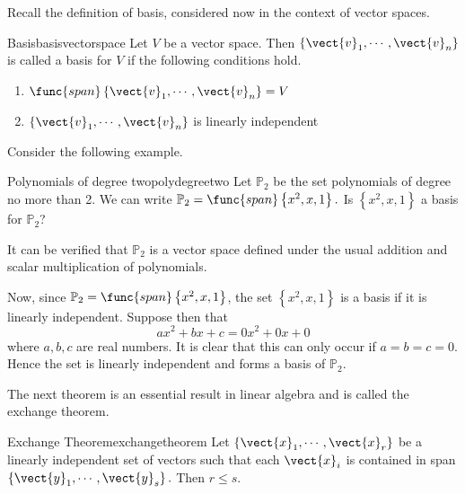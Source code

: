 Recall the definition of basis, considered now in the context of vector spaces.

\begin{definition}{Basis}{basisvectorspace}
Let $V$ be a vector space. Then $\{\vect{v}_{1},\cdots ,\vect{v}_{n}\}$ is called a basis for $V$ if the following conditions hold.
\begin{enumerate}
\item
$\func{span}\left\{ \vect{v}_{1},\cdots ,\vect{v}_{n}\right\} = V$
\item
$\{\vect{v}_{1},\cdots ,\vect{v}_{n}\}$ is linearly independent
\end{enumerate}
\end{definition}

Consider the following example.

\begin{example}{Polynomials of degree two}{polydegreetwo}
Let $\mathbb{P}_2$ be the set polynomials of degree no more than 2. We can write
$\mathbb{P}_2=\func{span}\left\{ x^{2}, x, 1\right\} .$ Is $\left\{ x^{2}, x, 1\right\} $ a
basis for $\mathbb{P}_2$?
\end{example}

\begin{solution}
It can be verified that $\mathbb{P}_2$ is a vector space defined under the usual addition and scalar multiplication of polynomials. 

Now, since $\mathbb{P}_2=\func{span}\left\{ x^{2},x, 1\right\}$, the set  $\left\{ x^{2}, x, 1\right\} $ is a basis if it is linearly independent. Suppose then that 
\begin{equation*}
ax^{2}+bx+c=0x^2 + 0x + 0 
\end{equation*}
where $a,b,c$ are real numbers. It is clear that this can only occur if $a=b=c=0$. Hence the set is linearly independent and forms a basis of $\mathbb{P}_2$.
\end{solution}

The next theorem is an essential result in linear algebra and is called the exchange theorem.

\begin{theorem}{Exchange Theorem}{exchangetheorem}
Let $\left\{ \vect{x}_{1},\cdots ,\vect{x}_{r}\right\} $
be a linearly independent set of vectors such that each $\vect{x}_{i}$ is
contained in span$\left\{ \vect{y}_{1},\cdots ,\vect{y}_{s}\right\} .$ Then $
r\leq s.$
\end{theorem}

